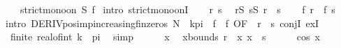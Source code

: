 \begin{isabellebody}
\ \ {\isacharparenleft}{\kern0pt}\ {\isachardoublequoteopen}strict{\isacharunderscore}{\kern0pt}mono{\isacharunderscore}{\kern0pt}on\ {\isacharquery}{\kern0pt}S\ {\isacharquery}{\kern0pt}f{\isachardoublequoteclose}{\isacharparenright}{\kern0pt}\isanewline
%
\isadelimproof
%
\endisadelimproof
%
\isatagproof
{}\isamarkupfalse%
\ {\isacharparenleft}{\kern0pt}intro\ strict{\isacharunderscore}{\kern0pt}mono{\isacharunderscore}{\kern0pt}onI{\isacharparenright}{\kern0pt}\isanewline
\ \ \isamarkupfalse%
\ r\ s\ \isamarkupfalse%
\ {\isachardoublequoteopen}r{\isasymin}{\isacharquery}{\kern0pt}S{\isachardoublequoteclose}\ {\isachardoublequoteopen}s{\isasymin}{\isacharquery}{\kern0pt}S{\isachardoublequoteclose}\ {\isachardoublequoteopen}r\ {\isacharless}{\kern0pt}\ s{\isachardoublequoteclose}\isanewline
\ \ \isamarkupfalse%
\ {\isachardoublequoteopen}{\isacharquery}{\kern0pt}f\ r\ {\isacharless}{\kern0pt}\ {\isacharquery}{\kern0pt}f\ s{\isachardoublequoteclose}\ \isanewline
\isanewline
\ \ \isamarkupfalse%
{\isacharparenleft}{\kern0pt}intro\ DERIV{\isacharunderscore}{\kern0pt}pos{\isacharunderscore}{\kern0pt}imp{\isacharunderscore}{\kern0pt}increasing{\isacharunderscore}{\kern0pt}fin{\isacharunderscore}{\kern0pt}zeros{\isacharbrackleft}{\kern0pt}\ {\isacharquery}{\kern0pt}N\ {\isacharequal}{\kern0pt}\ {\isachardoublequoteopen}{\isacharbraceleft}{\kern0pt}k{\isacharasterisk}{\kern0pt}pi{\isacharbraceright}{\kern0pt}{\isachardoublequoteclose}\ \ {\isacharquery}{\kern0pt}f\ {\isacharequal}{\kern0pt}\ {\isacharquery}{\kern0pt}f{\isacharcomma}{\kern0pt}\ OF\ {\isacharunderscore}{\kern0pt}\ {\isacartoucheopen}r\ {\isacharless}{\kern0pt}\ s{\isacartoucheclose}{\isacharbrackright}{\kern0pt}\ conjI\ exI{\isacharparenright}{\kern0pt}\isanewline
\ \ \ \ \isamarkupfalse%
\ {\isachardoublequoteopen}finite\ {\isacharbraceleft}{\kern0pt}real{\isacharunderscore}{\kern0pt}of{\isacharunderscore}{\kern0pt}int\ k\ {\isacharasterisk}{\kern0pt}\ pi{\isacharbraceright}{\kern0pt}{\isachardoublequoteclose}\ \isamarkupfalse%
\ simp\isanewline
\ \ \ \ \isamarkupfalse%
\ x\ \isamarkupfalse%
\ xbounds{\isacharcolon}{\kern0pt}\ {\isachardoublequoteopen}r\ {\isasymle}\ x{\isachardoublequoteclose}\ {\isachardoublequoteopen}x\ {\isasymle}\ s{\isachardoublequoteclose}\isanewline
\ \ \ \ \isamarkupfalse%
\ {\isachardoublequoteopen}cos\ x\ {\isasymnoteq}\ {}{\isachardoublequoteclose}\isanewline

\end{isabellebody}
